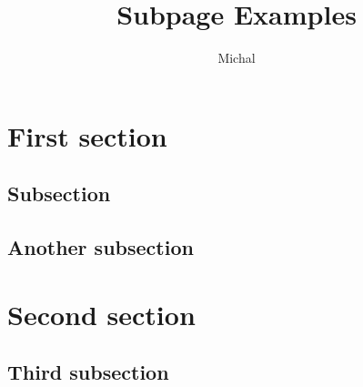\documentclass{article}
\begin{document}
\title{Subpage Examples}
\author{Michal}
\maketitle
\section{First section}
\subsection{Subsection}
\lipsum[1-2]
\subsection{Another subsection}
\lipsum[3-4]
\section{Second section}
\subsection{Third subsection}
\lipsum[5-6]
\end{document}
